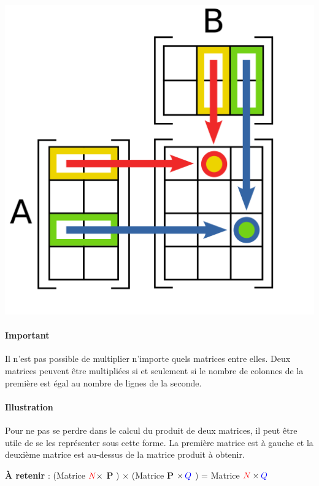 \documentclass[11pt,fleqn]{book} %
\begin{document}
\begin{minipage}{0.3\linewidth}
\includegraphics[width=\linewidth]{produit}
\end{minipage}\hfill \begin{minipage}{0.65\linewidth}
\paragraph{Important} Il n'est pas possible de multiplier n'importe quels matrices entre elles. Deux matrices peuvent être multipliées si et seulement si le nombre de colonnes de la première est égal au nombre de lignes de la seconde.


\paragraph{Illustration} Pour ne pas se perdre dans le calcul du produit de deux matrices, il peut être utile de se les représenter sous cette forme. La première matrice est à gauche et la deuxième matrice est au-dessus de la matrice produit à obtenir.
\end{minipage}

\begin{center}
\textbf{À retenir} : (Matrice  $ \color{red}{N} \color{black} \times$ \textbf{P} ) $\times$ (Matrice \textbf{P} $\times \, \color{blue}{Q}$ ) = Matrice $\color{red}{N} \color{black}\times \color{blue}{Q}$
\end{center}
\end{document}
